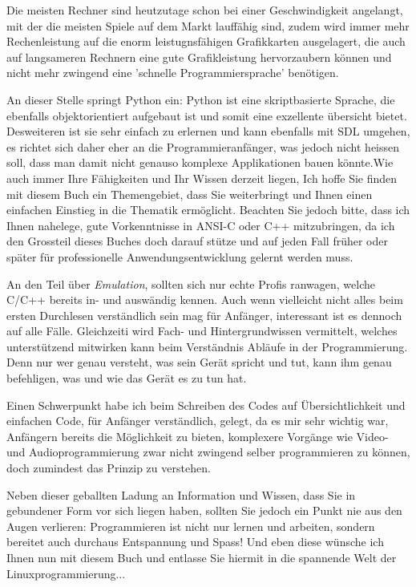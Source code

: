 \documentclass[b5paper,10pt,dvips,fleqn,titlepage,twoside]{book}
\begin{document}
Die meisten Rechner sind heutzutage schon bei einer Geschwindigkeit angelangt, mit der die meisten Spiele auf dem Markt lauff\"{a}hig sind, zudem wird immer mehr Rechenleistung auf die enorm leistugnsf\"{a}higen Grafikkarten ausgelagert, die auch auf langsameren Rechnern eine gute Grafikleistung hervorzaubern k\"{o}nnen und nicht mehr zwingend eine 'schnelle Programmiersprache' ben\"{o}tigen.

An dieser Stelle springt Python ein: Python ist eine skriptbasierte Sprache, die ebenfalls objektorientiert aufgebaut ist und somit eine exzellente \"{u}bersicht bietet. Desweiteren ist sie sehr einfach zu erlernen und kann ebenfalls mit SDL umgehen, es richtet sich daher eher an die Programmieranf\"{a}nger, was jedoch nicht heissen soll, dass man damit nicht genauso komplexe Applikationen bauen k\"{o}nnte.\newline Wie auch immer Ihre F\"{a}higkeiten und Ihr Wissen derzeit liegen, Ich hoffe Sie finden mit diesem Buch ein Themengebiet, dass Sie weiterbringt und Ihnen einen einfachen Einstieg in die Thematik erm\"{o}glicht.
Beachten Sie jedoch bitte, dass ich Ihnen nahelege, gute Vorkenntnisse in ANSI-C oder C++ mitzubringen, da ich den Grossteil dieses Buches doch darauf st\"{u}tze und auf jeden Fall fr\"{u}her oder sp\"{a}ter f\"{u}r professionelle Anwendungsentwicklung gelernt werden muss.

An den Teil \"{u}ber \textit{Emulation}, sollten sich nur echte Profis ranwagen, welche C/C++ bereits in- und ausw\"{a}ndig kennen. Auch wenn vielleicht nicht alles beim ersten Durchlesen verst\"{a}ndlich sein mag f\"{u}r Anf\"{a}nger, interessant ist es dennoch auf alle Fälle. Gleichzeiti wird Fach- und Hintergrundwissen vermittelt, welches unterstützend mitwirken kann beim Verst\"{a}ndnis Abläufe in der Programmierung.
Denn nur wer genau versteht, was sein Gerät spricht und tut, kann ihm genau befehligen, was und wie das Gerät es zu tun hat.

Einen Schwerpunkt habe ich beim Schreiben des Codes auf Übersichtlichkeit und einfachen Code, für Anfänger verständlich, gelegt, da es mir sehr wichtig war, Anfängern bereits die Möglichkeit zu bieten, komplexere Vorgänge wie Video- und Audioprogrammierung zwar nicht zwingend selber programmieren zu können, doch zumindest das Prinzip zu verstehen.

Neben dieser geballten Ladung an Information und Wissen, dass Sie in gebundener Form vor sich liegen haben, sollten Sie jedoch ein Punkt nie aus den Augen verlieren: Programmieren ist nicht nur lernen und arbeiten, sondern bereitet auch durchaus Entspannung und Spass! Und eben diese w\"{u}nsche ich Ihnen nun mit diesem Buch und entlasse Sie hiermit in die spannende Welt der Linuxprogrammierung...
\end{document}
